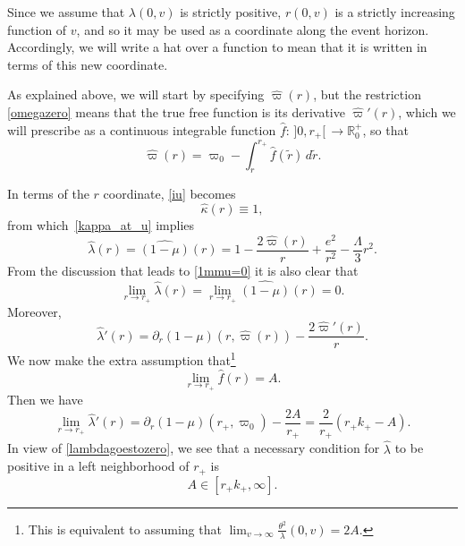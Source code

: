 \documentclass[a4paper,11pt,oneside,reqno]{amsart}
\newcommand{\kk}{k_+}
\newcommand{\R}{\mathbb{R}}
\begin{document}
Since we assume that $\lambda(0,v)$ is strictly positive, $r(0,v)$ is a strictly increasing function of $v$, and so it may be used as a coordinate along the event horizon.
Accordingly, we will write a hat over a function to mean that it is written in terms of this new coordinate.

As explained above, we will start by specifying $\hat\varpi(r)$, but the restriction \eqref{omegazero} means that the true free function is its derivative $\hat \varpi'(r)$, which we will prescribe as a continuous integrable function $\hat f:\,]0,r_+[\,\to\R^+_0$, so that
\begin{equation}\label{omega_eh}
\hat{\varpi}(r)=\varpi_0-\int_r^{r_+}\hat f(\tilde r)\,d\tilde r.
\end{equation}

In terms of the $r$ coordinate, \eqref{iu} becomes
\begin{equation}\label{kappa_eh}
\hat\kappa(r)\equiv 1,
\end{equation}
from which~\eqref{kappa_at_u} implies
\begin{equation}\label{lambda_eh}
\hat{\lambda}(r)=\widehat{(1-\mu)}(r)=1-\frac{2\hat{\varpi}(r)}{r}+\frac{e^2}{r^2}-\frac{\Lambda}{3}r^2.
\end{equation}
From the discussion that leads to \eqref{1mmu=0} it is also clear that
\begin{equation} \label{lambdagoestozero}
\lim_{r\to r_+}\hat{\lambda}(r)=\lim_{r\to r_+}\widehat{(1-\mu)}(r)=0.
\end{equation}
Moreover,
$$
\hat{\lambda}'(r)=\partial_r(1-\mu)(r,\hat\varpi(r))-\frac{2\hat{\varpi}'(r)}{r}.
$$
We now make the extra assumption that\footnote{This is equivalent to assuming that $\lim_{v \to \infty} \frac{\theta^2}{\lambda}(0,v)=2A$.}
$$\lim_{r\to r_+}\hat f(r) = A.
$$
Then we have
\begin{equation}\label{lambda_d_eh}
\lim_{r\to r_+}\hat{\lambda}'(r)=\partial_r(1-\mu)(r_+,\varpi_0)-\frac{2A}{r_+} = \frac{2}{r_+}(r_+\kk - A).
\end{equation}
In view of \eqref{lambdagoestozero}, we see that a necessary condition for $\hat{\lambda}$ to be positive in a left
neighborhood of $r_+$ is
\begin{equation}
\label{A}
A\in\left[ r_+ \kk,\infty\right].
\end{equation}  
\end{document}
